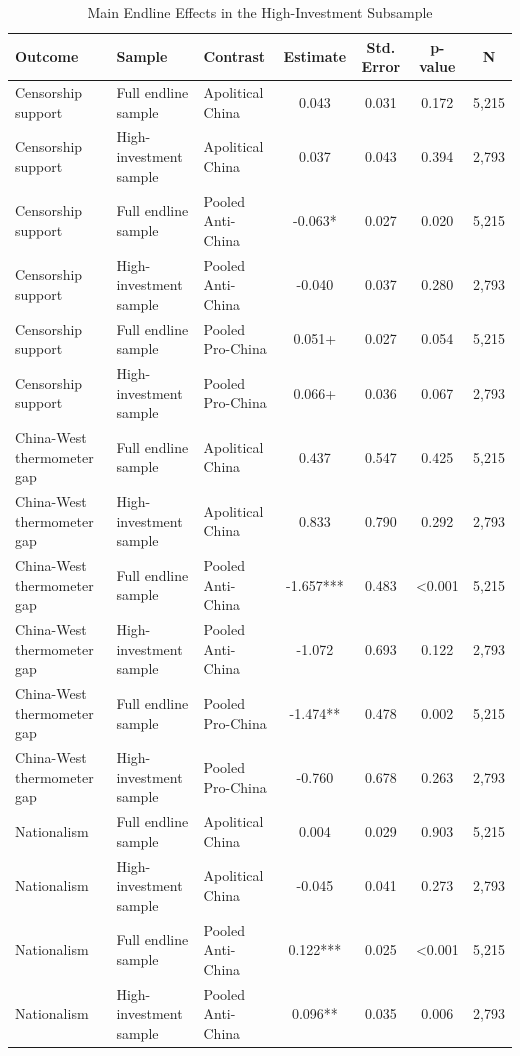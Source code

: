 \begin{table}[H]
\centering
\caption{Main Endline Effects in the High-Investment Subsample}
\label{tab:high_investment_robustness_t1}
\footnotesize
\begin{threeparttable}
\begin{tabular}{lllcccc}
\toprule
Outcome & Sample & Contrast & Estimate & Std. Error & p-value & N \\
\midrule
Censorship support & Full endline sample & Apolitical China & 0.043 & 0.031 & 0.172 & 5,215 \\
Censorship support & High-investment sample & Apolitical China & 0.037 & 0.043 & 0.394 & 2,793 \\
Censorship support & Full endline sample & Pooled Anti-China & -0.063* & 0.027 & 0.020 & 5,215 \\
Censorship support & High-investment sample & Pooled Anti-China & -0.040 & 0.037 & 0.280 & 2,793 \\
Censorship support & Full endline sample & Pooled Pro-China & 0.051+ & 0.027 & 0.054 & 5,215 \\
Censorship support & High-investment sample & Pooled Pro-China & 0.066+ & 0.036 & 0.067 & 2,793 \\
China-West thermometer gap & Full endline sample & Apolitical China & 0.437 & 0.547 & 0.425 & 5,215 \\
China-West thermometer gap & High-investment sample & Apolitical China & 0.833 & 0.790 & 0.292 & 2,793 \\
China-West thermometer gap & Full endline sample & Pooled Anti-China & -1.657*** & 0.483 & <0.001 & 5,215 \\
China-West thermometer gap & High-investment sample & Pooled Anti-China & -1.072 & 0.693 & 0.122 & 2,793 \\
China-West thermometer gap & Full endline sample & Pooled Pro-China & -1.474** & 0.478 & 0.002 & 5,215 \\
China-West thermometer gap & High-investment sample & Pooled Pro-China & -0.760 & 0.678 & 0.263 & 2,793 \\
Nationalism & Full endline sample & Apolitical China & 0.004 & 0.029 & 0.903 & 5,215 \\
Nationalism & High-investment sample & Apolitical China & -0.045 & 0.041 & 0.273 & 2,793 \\
Nationalism & Full endline sample & Pooled Anti-China & 0.122*** & 0.025 & <0.001 & 5,215 \\
Nationalism & High-investment sample & Pooled Anti-China & 0.096** & 0.035 & 0.006 & 2,793 \\

\end{tabular}
\end{threeparttable}
\end{table}
